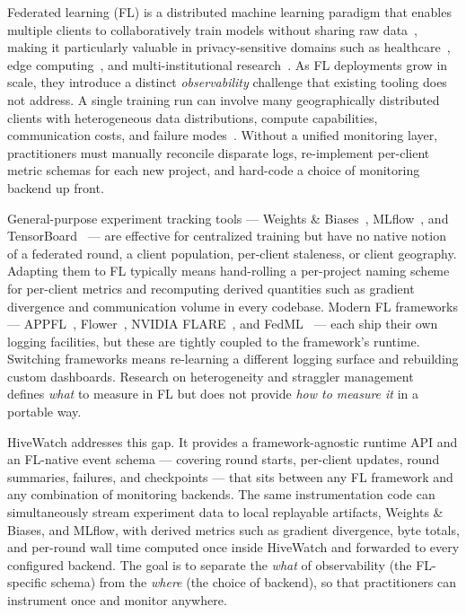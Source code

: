 Federated learning (FL) is a distributed machine learning paradigm that enables multiple clients to collaboratively train models without sharing raw data~\cite{mcmahan2017communication}, making it particularly valuable in privacy-sensitive domains such as healthcare~\cite{rieke2020future}, edge computing~\cite{lim2020federated}, and multi-institutional research~\cite{kairouz2021advances}. As FL deployments grow in scale, they introduce a distinct \emph{observability} challenge that existing tooling does not address. A single training run can involve many geographically distributed clients with heterogeneous data distributions, compute capabilities, communication costs, and failure modes~\cite{li2020federated}. Without a unified monitoring layer, practitioners must manually reconcile disparate logs, re-implement per-client metric schemas for each new project, and hard-code a choice of monitoring backend up front.

General-purpose experiment tracking tools — Weights \& Biases~\cite{wandb}, MLflow~\cite{mlflow}, and TensorBoard~\cite{tensorboard} — are effective for centralized training but have no native notion of a federated round, a client population, per-client staleness, or client geography. Adapting them to FL typically means hand-rolling a per-project naming scheme for per-client metrics and recomputing derived quantities such as gradient divergence and communication volume in every codebase. Modern FL frameworks — APPFL~\cite{ryu2022appfl,li2025advances}, Flower~\cite{beutel2020flower}, NVIDIA FLARE~\cite{roth2022nvidia}, and FedML~\cite{he2020fedml} — each ship their own logging facilities, but these are tightly coupled to the framework's runtime. Switching frameworks means re-learning a different logging surface and rebuilding custom dashboards. Research on heterogeneity and straggler management~\cite{lai2021oort,li2024fedcompass,xie2019asynchronous,nguyen2022federated} defines \emph{what} to measure in FL but does not provide \emph{how to measure it} in a portable way.

HiveWatch addresses this gap. It provides a framework-agnostic runtime API and an FL-native event schema — covering round starts, per-client updates, round summaries, failures, and checkpoints — that sits between any FL framework and any combination of monitoring backends. The same instrumentation code can simultaneously stream experiment data to local replayable artifacts, Weights \& Biases, and MLflow, with derived metrics such as gradient divergence, byte totals, and per-round wall time computed once inside HiveWatch and forwarded to every configured backend. The goal is to separate the \emph{what} of observability (the FL-specific schema) from the \emph{where} (the choice of backend), so that practitioners can instrument once and monitor anywhere.
